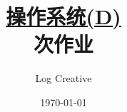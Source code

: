 \documentclass[12pt,a4paper]{article}
\newenvironment{problems}{\begin{list}{}{\renewcommand{\makelabel}[1]{\textbf{##1}\hfil}}}{\end{list}}
\providecommand{\ans}{\textbf{答}:~}
\begin{document}
\title{\normalsize \underline{操作系统(D)}\\ 次作业}
\author{Log Creative }
\date{\today}
\maketitle



\end{document}
